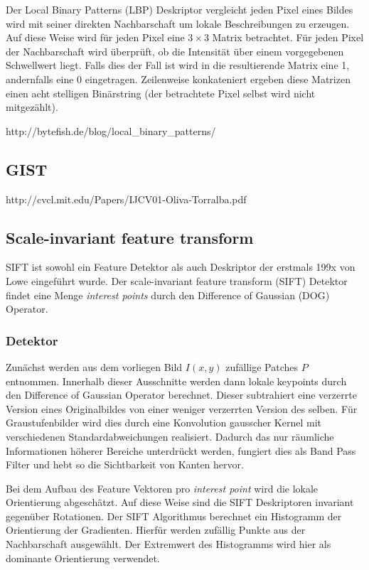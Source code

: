 Der Local Binary Patterns (LBP) Deskriptor vergleicht jeden Pixel eines Bildes wird mit seiner direkten Nachbarschaft um lokale Beschreibungen zu erzeugen. Auf diese Weise wird für jeden Pixel eine $3 \times 3$ Matrix betrachtet. Für jeden Pixel der Nachbarschaft wird überprüft, ob die Intensität über einem vorgegebenen Schwellwert liegt. Falls dies der Fall ist wird in die resultierende Matrix eine 1, andernfalls eine 0 eingetragen. Zeilenweise konkateniert ergeben diese Matrizen einen acht stelligen Binärstring (der betrachtete Pixel selbst wird nicht mitgezählt).

http://bytefish.de/blog/local\_binary\_patterns/

\subsection{GIST}

http://cvcl.mit.edu/Papers/IJCV01-Oliva-Torralba.pdf

\subsection{Scale-invariant feature transform}

SIFT ist sowohl ein Feature Detektor als auch Deskriptor der erstmals 199x von Lowe eingeführt wurde. Der scale-invariant feature transform (SIFT) Detektor findet eine Menge \textit{interest points} durch den Difference of Gaussian (DOG) Operator. 

\subsubsection{Detektor}

Zunächst werden aus dem vorliegen Bild $I(x, y)$ zufällige Patches $P$ entnommen. Innerhalb dieser Ausschnitte werden dann lokale keypoints durch den Difference of Gaussian Operator berechnet. Dieser subtrahiert eine verzerrte Version eines Originalbildes von einer weniger verzerrten Version des selben. Für Graustufenbilder wird dies durch eine Konvolution gausscher Kernel mit verschiedenen Standardabweichungen realisiert. Dadurch das nur räumliche Informationen höherer Bereiche unterdrückt werden, fungiert dies als Band Pass Filter und hebt so die Sichtbarkeit von Kanten hervor.

Bei dem Aufbau des Feature Vektoren pro \textit{interest point} wird die lokale Orientierung abgeschätzt. Auf diese Weise sind die SIFT Deskriptoren invariant gegenüber Rotationen. Der SIFT Algorithmus berechnet ein Histogramm der Orientierung der Gradienten. Hierfür werden zufällig Punkte aus der Nachbarschaft ausgewählt. Der Extremwert des Histogramms wird hier als dominante Orientierung verwendet.

